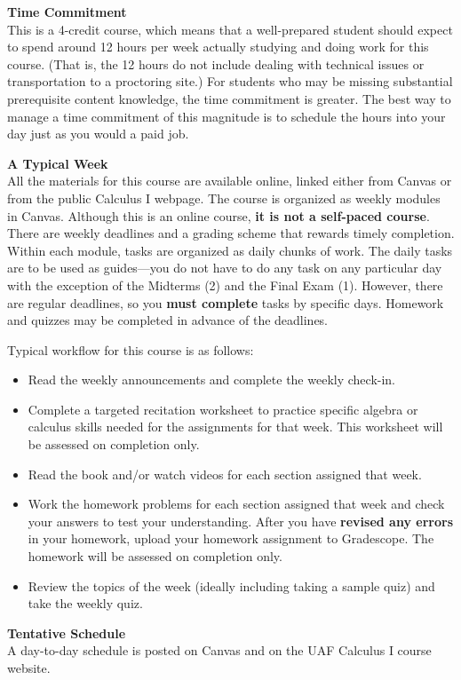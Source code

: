 \documentclass[12pt]{article}
\renewcommand{\emph}[1]{\textsf{\textbf{#1}}}
\newcommand{\localhead}[1]{\par\smallskip\textbf{#1}\nobreak\\}%
\def\heading#1{\localhead{\large\emph{#1}}}
\begin{document}
\heading{Time Commitment}
This is a 4-credit course, which means that a well-prepared student should expect to spend around 12
hours per week actually studying and doing work for this course. (That is, the 12 hours do not include dealing with
technical issues or transportation to a proctoring site.) For students who may be missing substantial
prerequisite content knowledge, the time commitment is greater. The best way to manage a time
commitment of this magnitude is to schedule the hours into your day just as you would a paid job.

\heading{A Typical Week}
All the materials for this course are available online, linked either from Canvas or from the public Calculus I webpage. The course is organized as weekly modules in Canvas. Although this is
an online course, \emph{it is not a self-paced course}. There are weekly
deadlines and a grading scheme that rewards timely completion. Within each module, tasks are
organized as daily chunks of work. The daily tasks are to be used as guides---you do not have
to do any task on any particular day with the exception of the Midterms (2) and the
Final Exam (1). However, there are regular deadlines, so you \emph{must complete} tasks by specific days. Homework and quizzes may be completed in advance of the deadlines. 

Typical workflow for this course is as follows: 
\begin{itemize}
\item Read the weekly announcements and complete the weekly check-in.
\item Complete a targeted recitation worksheet to practice specific algebra or calculus skills needed for the assignments for that week. This worksheet will be assessed on completion only.
\item Read the book and/or watch videos for each section assigned that week.
\item Work the homework problems for each section assigned that week and check your answers to test your understanding. After you have \emph{revised any errors} in your homework, upload your homework assignment to Gradescope. The homework will be assessed on completion only.
\item Review the topics of the week (ideally including taking a sample quiz) and take the weekly quiz.
\end{itemize}

\heading{Tentative Schedule}
A day-to-day schedule is posted on Canvas and on the UAF Calculus I course website. 
\end{document}
